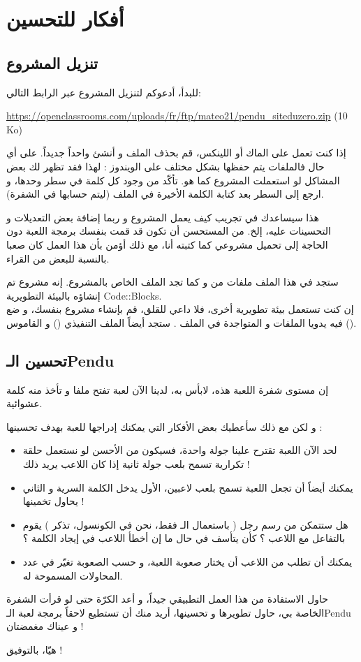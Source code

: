 \section{أفكار للتحسين}

\subsection{تنزيل المشروع}

للبدأ، أدعوكم لتنزيل المشروع عبر الرابط التالي:

\url{https://openclassrooms.com/uploads/fr/ftp/mateo21/pendu_siteduzero.zip} \textenglish{(10 Ko)}

إذا كنت تعمل على الماك أو اللينكس، قم بحذف الملف
و أنشئ واحداً جديداً. على أي حال فالملفات يتم حفظها بشكل مختلف على الويندوز : لهذا فقد تظهر لك بعض المشاكل لو استعملت المشروع كما هو. تأكّد من وجود كل كلمة في سطر وحدها، و ارجع إلى السطر بعد كتابة الكلمة الأخيرة في الملف (ليتم حسابها في الشفرة).

هذا سيساعدك في تجريب كيف يعمل المشروع و ربما إضافة بعض التعديلات و التحسينات عليه، إلخ. من المستحسن أن تكون قد قمت بنفسك برمجة اللعبة دون الحاجة إلى تحميل مشروعي كما كتبته أنا، مع ذلك أؤمن بأن هذا العمل كان صعبا بالنسبة للبعض من القراء.

ستجد في هذا الملف
ملفات من
 و
كما تجد الملف
الخاص بالمشروع. إنه مشروع تم إنشاؤه بالبيئة التطويرية
\textenglish{Code::Blocks}.\\
إن كنت تستعمل بيئة تطويرية أخرى، فلا داعي للقلق، قم بإنشاء مشروع بنفسك، و ضع فيه يدويا الملفات
و
المتواجدة في الملف
.
ستجد أيضاً الملف التنفيذي
()
و القاموس
().

\subsection{تحسين الـ\textenglish{Pendu}}

إن مستوى شفرة اللعبة هذه، لابأس به، لدينا الآن لعبة تفتح ملفا و تأخذ منه كلمة عشوائية.

و لكن مع ذلك سأعطيك بعض الأفكار التي يمكنك إدراجها للعبة بهدف تحسينها :

\begin{itemize}
  \item لحد الآن اللعبة تقترح علينا جولة واحدة، فسيكون من الأحسن لو نستعمل حلقة تكرارية تسمح بلعب جولة ثانية إذا كان اللاعب يريد ذلك !
  \item يمكنك أيضاً أن تجعل اللعبة تسمح بلعب لاعبين، الأول يدخل الكلمة السرية و الثاني يحاول تخمينها !
  \item هل ستتمكن من رسم رجل ( باستعمال الـ
 فقط، نحن في الكونسول، تذكر ) يقوم بالتفاعل مع اللاعب ؟ كأن يتأسف في حال ما إن أخطأ اللاعب في إيجاد الكلمة ؟
  \item يمكنك أن تطلب من اللاعب أن يختار صعوبة اللعبة، و حسب الصعوبة تغيّر في عدد المحاولات المسموحة له.
\end{itemize}

حاول الاستفادة من هذا العمل التطبيقي جيداً، و أعد الكرّة حتى لو قرأت الشفرة الخاصة بي، حاول تطويرها و تحسينها، أريد منك أن تستطيع لاحقاً برمجة لعبة الـ\textenglish{Pendu}
و عيناك مغمضتان !

هيّا، بالتوفيق !
